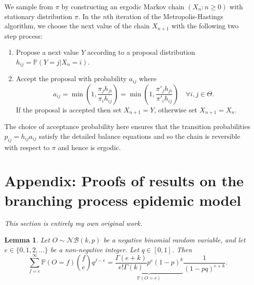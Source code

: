 \documentclass{article}
\newtheorem{lemma}[proposition]{Lemma}
\begin{document}
We sample from \(\pi\) by constructing an ergodic Markov chain \((X_n : n \geq 0)\) with stationary distribution \(\pi\). In the \(n\)th iteration of the Metropolis-Hastings algorithm, we choose the next value of the chain \(X_{n+1}\) with the following two step process:
\begin{enumerate}
    \item Propose a next value \(Y\) according to a proposal distribution \(h_{ij} = \mathbb{P}(Y=j | X_n=i)\).
    \item Accept the proposal with probability \(a_{ij}\) where
        \[a_{ij} = \min\left(1, \frac{\pi_j h_{ji}}{\pi_i h_{ij}}\right) = \min\left(1, \frac{\pi'_j h_{ji}}{\pi'_i h_{ij}}\right) \quad \forall i, j \in \Theta.\]
        If the proposal is accepted then set \(X_{n+1} = Y\), otherwise set \(X_{n+1} = X_n\).
\end{enumerate}
The choice of acceptance probability here ensures that the transition probabilities \(p_{ij} = h_{ij} a_{ij}\) satisfy the detailed balance equations and so the chain is reversible with respect to \(\pi\) and hence is ergodic.

\pagebreak[4]
\section{Appendix: Proofs of results on the branching process epidemic model}\label{app:proofs}
\textit{This section is entirely my own original work.}

\begin{lemma}\label{thm:nbinom-lemma}
Let \(O \sim \mathcal{NB}(k, p)\) be a negative binomial random variable, and let \(e \in \{0, 1, 2, \dots\}\) be a non-negative integer. Let \(q \in [0,1]\).
Then
\[\sum_{f=e}^\infty \mathbb{P}(O = f) \binom{f}{e} q^{f-e} = \underbrace{\frac{\Gamma(e+k)}{e! \Gamma(k)} p^e (1-p)^k}_{\mathbb{P}(O = e)} \frac{1}{(1-pq)^{e+k}}.\]
\end{lemma}
\end{document}
